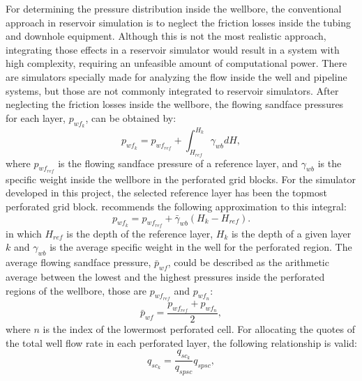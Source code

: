 For determining the pressure distribution inside the wellbore, the conventional approach in reservoir simulation is to neglect the friction losses inside the tubing and downhole equipment.
%
Although this is not the most realistic approach, integrating those effects in a reservoir simulator would result in a system with high complexity, requiring an unfeasible amount of computational power.
%
There are simulators specially made for analyzing the flow inside the well and pipeline systems, but those are not commonly integrated to reservoir simulators.
%
After neglecting the friction losses inside the wellbore, the flowing sandface pressures for each layer, $p_{wf_k}$, can be obtained by:
%
%
\begin{equation}
	p_{wf_k} = p_{wf_{ref}} + \int_{H_{ref}}^{H_k} \gamma_{wb} dH,
\end{equation}
%
where $p_{wf_{ref}}$ is the flowing sandface pressure of a reference layer, and $\gamma_{wb}$ is the specific weight inside the wellbore in the perforated grid blocks.
%
For the simulator developed in this project, the selected reference layer has been the topmost perforated grid block.
%
\cite{Ertekin2001} recommends the following approximation to this integral:
%
\begin{equation}
	\label{equation-bottom-hole-pressure-multilayer}
	p_{wf_k} = p_{wf_{ref}} + \bar{\gamma}_{wb} (H_k - H_{ref}).
\end{equation}
%
in which $H_{ref}$ is the depth of the reference layer, $H_k$ is the depth of a given layer $k$ and $\gamma_{wb}$ is the average specific weight in the well for the perforated region.
%
The average flowing sandface pressure, $\bar{p}_{wf}$, could be described as the arithmetic average between the lowest and the highest pressures inside the perforated regions of the wellbore, those are $p_{{wf}_{ref}}$ and $p_{{wf}_n}$:
%
\begin{equation}
	\label{equation-average-bottom-hole-pressure-multilayer}
	\bar{p}_{wf} = \frac{p_{wf_{ref}} + p_{wf_{n}}}{2},
\end{equation}
%
where $n$ is the index of the lowermost perforated cell.
%
For allocating the quotes of the total well flow rate in each perforated layer, the following relationship is valid:
%
\begin{equation}
	q_{sc_k} = \frac{q_{sc_k}}{q_{spsc}}q_{spsc},
\end{equation}
